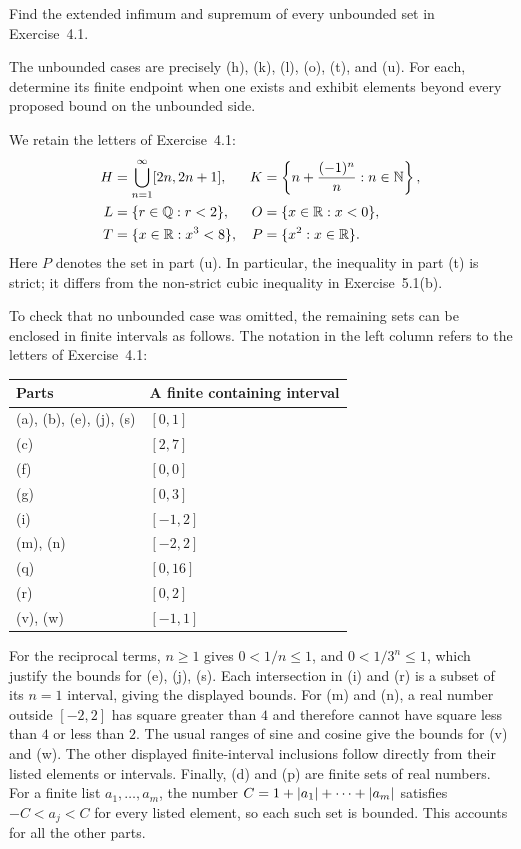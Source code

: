 \goal Find the extended infimum and supremum of every unbounded set
in Exercise~4.1.

\idea The unbounded cases are precisely \textup{(h)}, \textup{(k)},
\textup{(l)}, \textup{(o)}, \textup{(t)}, and \textup{(u)}.
For each, determine its finite endpoint when one exists and exhibit
elements beyond every proposed bound on the unbounded side.

We retain the letters of Exercise~4.1:
\begin{align*}
 H&=\bigcup_{n=1}^{\infty}[2n,2n+1],
 &K&=\left\{n+\frac{(-1)^n}{n}:n\in\mathbb{N}\right\},\\
 L&=\{r\in\mathbb{Q}:r<2\},
 &O&=\{x\in\mathbb{R}:x<0\},\\
 T&=\{x\in\mathbb{R}:x^3<8\},
 &P&=\{x^2:x\in\mathbb{R}\}.
\end{align*}
Here $P$ denotes the set in part \textup{(u)}. In particular, the
inequality in part \textup{(t)} is strict; it differs from the
non-strict cubic inequality in Exercise~5.1(b).

To check that no unbounded case was omitted, the remaining sets can
be enclosed in finite intervals as follows. The notation in the left
column refers to the letters of Exercise~4.1:
\begin{center}
\begin{tabular}{@{}ll@{}}
\toprule
Parts & A finite containing interval\\
\midrule
\textup{(a), (b), (e), (j), (s)} & $[0,1]$\\
\textup{(c)} & $[2,7]$\\
\textup{(f)} & $[0,0]$\\
\textup{(g)} & $[0,3]$\\
\textup{(i)} & $[-1,2]$\\
\textup{(m), (n)} & $[-2,2]$\\
\textup{(q)} & $[0,16]$\\
\textup{(r)} & $[0,2]$\\
\textup{(v), (w)} & $[-1,1]$\\
\bottomrule
\end{tabular}
\end{center}
For the reciprocal terms, $n\ge1$ gives $0<1/n\le1$, and
$0<1/3^n\le1$, which justify the bounds for \textup{(e), (j), (s)}.
Each intersection in \textup{(i)} and \textup{(r)} is a subset of
its $n=1$ interval, giving the displayed bounds. For \textup{(m)}
and \textup{(n)}, a real number outside $[-2,2]$ has square greater
than $4$ and therefore cannot have square less than $4$ or less than
$2$. The usual ranges of sine and cosine give the bounds for
\textup{(v)} and \textup{(w)}. The other displayed finite-interval
inclusions follow directly from their listed elements or intervals.
Finally, \textup{(d)} and \textup{(p)} are finite sets of real numbers.
For a finite list $a_1,\ldots,a_m$, the number
$C=1+\left|a_1\right|+\cdots+\left|a_m\right|$ satisfies
$-C<a_j<C$ for every listed element, so each such set is bounded.
This accounts for all the other parts.

